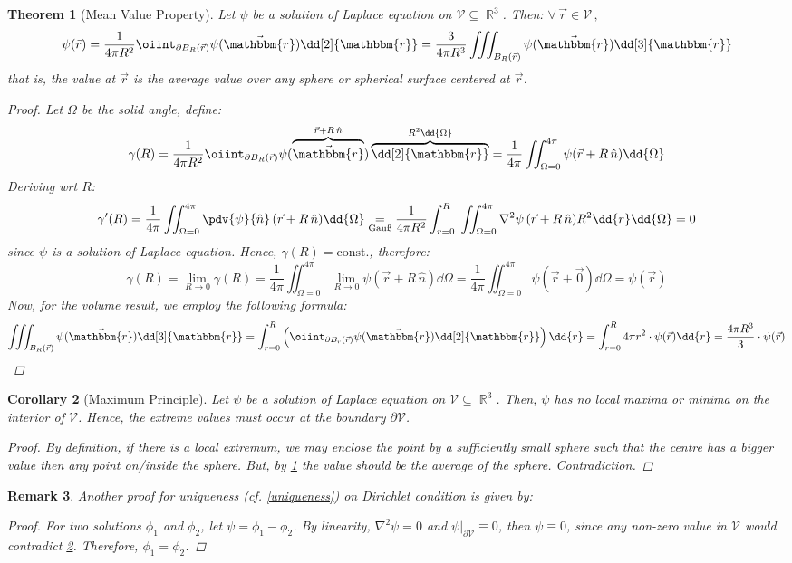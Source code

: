 \documentclass[12pt]{article}
\newcommand*{\lapl}{\nabla^2}
\newcommand{\Forall}[1]{\forall\,{#1}\,,\,}
\DeclareMathOperator{\R}{\mathbb{R}}
\newcommand*{\rv}{\vec{r}}
\newcommand*{\ir}{\mathbbm{r}}
\newcommand*{\irv}{\vec{\mathbbm{r}}}
\newcommand*{\vol}{\mathcal{V}}
\newtheorem{theorem}{Theorem}[subsection]
\newtheorem{corollary}[theorem]{Corollary}
\newtheorem{remark}[theorem]{Remark}
\begin{document}
\begin{theorem}[Mean Value Property]
  \label{mean_value_prop}
  Let $\psi$ be a solution of Laplace equation on $\vol\subseteq\R^3$. Then: $\Forall{\rv\in\vol}$ $$\psi(\rv)=\frac{1}{4\pi R^2}\oiint_{\partial B_R(\rv)}\psi(\irv)\dd[2]{\ir}=\frac{3}{4\pi R^3}\iiint_{B_R(\rv)}\psi(\irv)\dd[3]{\ir}$$ that is, the value at $\rv$ is the average value over any sphere or spherical surface centered at $\rv$.
  \begin{proof}
    Let $\Omega$ be the solid angle, define: $$\gamma(R)=\frac{1}{4\pi R^2}\oiint_{\partial B_R(\rv)}\psi(\overbrace{\irv}^{\rv+R\,\hat{n}})\overbrace{\dd[2]{\ir}}^{R^2\dd{\Omega}}=\frac{1}{4\pi}\iint_{\Omega=0}^{4\pi}\psi(\rv+R\,\hat{n})\dd{\Omega}$$ Deriving wrt $R$: $$\gamma'(R)=\frac{1}{4\pi}\iint_{\Omega=0}^{4\pi}\pdv{\psi}{\hat{n}}\,(\rv+R\,\hat{n})\dd{\Omega}\underset{\text{Gauß}}{=}\frac{1}{4\pi R^2}\int_{r=0}^R\;\iint_{\Omega=0}^{4\pi}\lapl\psi\,(\rv+R\,\hat{n})R^2\dd{r}\dd{\Omega}=0$$ since $\psi$ is a solution of Laplace equation. Hence, $\gamma(R)=\text{const.}$, therefore: $$\gamma(R)=\lim_{R\to 0}\gamma(R)=\frac{1}{4\pi}\iint_{\Omega=0}^{4\pi}\lim_{R\to 0}\psi(\rv+R\,\hat{n})\dd{\Omega}=\frac{1}{4\pi}\iint_{\Omega=0}^{4\pi}\psi(\rv+\vec{0})\dd{\Omega}=\psi(\rv)$$
    Now, for the volume result, we employ the following formula: $$\iiint_{B_R(\rv)}\psi(\irv)\dd[3]{\ir}=\int_{r=0}^R\left(\oiint_{\partial B_r(\rv)}\psi(\irv)\dd[2]{\ir}\right)\dd{r}=\int_{r=0}^R4\pi r^2\cdot\psi(\rv)\dd{r}=\frac{4\pi R^3}{3}\cdot\psi(\rv)$$
  \end{proof}
\end{theorem}

\begin{corollary}[Maximum Principle]
  \label{maximum_lapl}
  Let $\psi$ be a solution of Laplace equation on $\vol\subseteq\R^3$. Then, $\psi$ has no local maxima or minima on the interior of $\vol$. Hence, the extreme values must occur at the boundary $\partial\vol$.
  \begin{proof}
    By definition, if there is a local extremum, we may enclose the point by a sufficiently small sphere such that the centre has a bigger value then any point on/inside the sphere. But, by \ref{mean_value_prop} the value should be the average of the sphere. Contradiction.
  \end{proof}
\end{corollary}

\begin{remark}
  Another proof for uniqueness (cf. \ref{uniqueness}) on Dirichlet condition is given by: 
  \begin{proof}
    For two solutions $\phi_1$ and $\phi_2$, let $\psi=\phi_1-\phi_2$. By linearity, $\lapl\psi=0$ and $\psi\big|_{\partial\vol}\equiv 0$, then $\psi\equiv 0$, since any non-zero value in $\vol$ would contradict \ref{maximum_lapl}. Therefore, $\phi_1=\phi_2$.
  \end{proof}
\end{remark}
\end{document}
